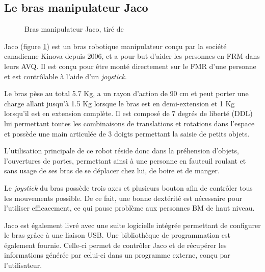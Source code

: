 \documentclass[letterpaper, twoside, 12pt, memoire, creativecommons, hyperref]{thETS}
\begin{document}
\subsection{Le bras manipulateur Jaco}

\begin{figure}
	\centering
	\caption{Bras manipulateur Jaco, tiré de \cite{Kinova2012}}
	\label{fig:jacofull}
\end{figure}

Jaco (figure \ref{fig:jacofull}) est un bras robotique manipulateur conçu par la société canadienne Kinova depuis 2006, et a pour but d'aider les personnes en FRM dans leurs AVQ. Il est conçu pour être monté directement sur le FMR d'une personne et est contrôlable à l'aide d'un \textit{joystick}.

Le bras pèse au total 5.7 Kg, a un rayon d'action de 90 cm et peut porter une charge allant jusqu'à 1.5 Kg lorsque le bras est en demi-extension et 1 Kg lorsqu'il est en extension complète. Il est composé de 7 degrés de liberté (DDL) lui permettant toutes les combinaisons de translations et rotations dans l'espace et possède une main articulée de 3 doigts permettant la saisie de petits objets.

L'utilisation principale de ce robot réside donc dans la préhension d'objets, l'ouvertures de portes, permettant ainsi à une personne en fauteuil roulant et sans usage de ses bras de se déplacer chez lui, de boire et de manger.

Le \textit{joystick} du bras possède trois axes et plusieurs bouton afin de contrôler tous les mouvements possible. De ce fait, une bonne dextérité est nécessaire pour l'utiliser efficacement, ce qui pause problème aux personnes BM de haut niveau.

Jaco est également livré avec une suite logicielle intégrée permettant de configurer le bras grâce à une liaison USB. Une bibliothèque de programmation est également fournie. Celle-ci permet de contrôler Jaco et de récupérer les informations générée par celui-ci dans un programme externe, conçu par l'utilisateur. 
\end{document}
